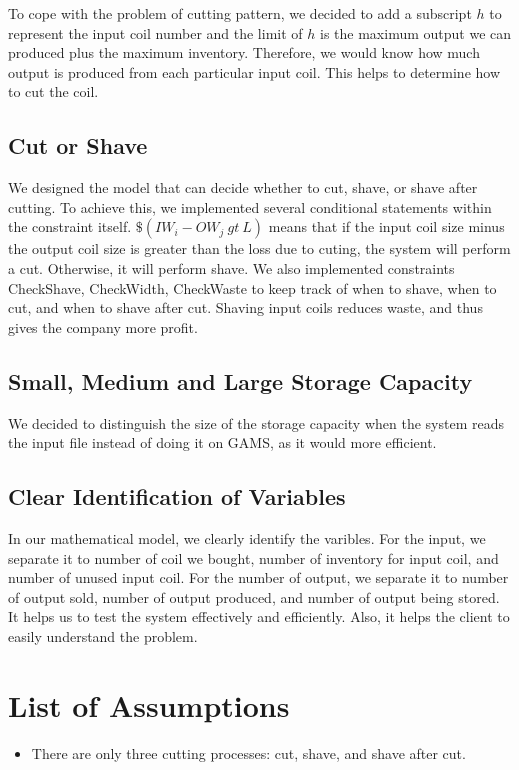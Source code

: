 \documentclass{article}[12pt]
\begin{document}
{To cope with the problem of cutting pattern, we decided to add a subscript $h$ to represent the input coil number and the limit of $h$ is the maximum output we can produced plus the maximum inventory.  Therefore, we would know how much output is produced from each particular input coil.  This helps to determine how to cut the coil. \\

\subsection{Cut or Shave}

We designed the model that can decide whether to cut, shave, or shave after cutting.  To achieve this, we implemented several conditional statements within the constraint itself.  $\$(IW_{i} - OW_{j}\ gt\ L)$ means that if the input coil size minus the output coil size is greater than the loss due to cuting, the system will perform a cut.  Otherwise, it will perform shave.  We also implemented constraints CheckShave, CheckWidth, CheckWaste to keep track of when to shave, when to cut, and when to shave after cut.  Shaving input coils reduces waste, and thus gives the company more profit. \\ 

\subsection{Small, Medium and Large Storage Capacity}

We decided to distinguish the size of the storage capacity when the system reads the input file instead of doing it on GAMS, as it would more efficient. \\

\subsection{Clear Identification of Variables}
In our mathematical model, we clearly identify the varibles. For the input, we separate it to number of coil we bought, number of inventory for input coil, and number of unused input coil.  For the number of output, we separate it to number of output sold, number of output produced, and number of output being stored.  It helps us to test the system effectively and efficiently. Also, it helps the client to easily understand the problem. \\

\section{List of Assumptions}
\begin{itemize}
	\item There are only three cutting processes: cut, shave, and shave after cut.
	

\end{itemize}}
\end{document}
